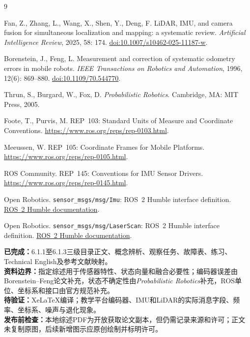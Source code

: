 \documentclass[UTF8,zihao=-4]{ctexart}
\begin{document}
\begin{thebibliography}{9}

Fan, Z., Zhang, L., Wang, X., Shen, Y., Deng, F.
LiDAR, IMU, and camera fusion for simultaneous localization and mapping: a systematic review.
\emph{Artificial Intelligence Review}, 2025, 58: 174.
\href{https://doi.org/10.1007/s10462-025-11187-w}{doi:10.1007/s10462-025-11187-w}.

Borenstein, J., Feng, L.
Measurement and correction of systematic odometry errors in mobile robots.
\emph{IEEE Transactions on Robotics and Automation}, 1996, 12(6): 869--880.
\href{https://doi.org/10.1109/70.544770}{doi:10.1109/70.544770}.

Thrun, S., Burgard, W., Fox, D.
\emph{Probabilistic Robotics}.
Cambridge, MA: MIT Press, 2005.

Foote, T., Purvis, M.
REP~103: Standard Units of Measure and Coordinate Conventions.
\href{https://www.ros.org/reps/rep-0103.html}{https://www.ros.org/reps/rep-0103.html}.

Meeussen, W.
REP~105: Coordinate Frames for Mobile Platforms.
\href{https://www.ros.org/reps/rep-0105.html}{https://www.ros.org/reps/rep-0105.html}.

ROS Community.
REP~145: Conventions for IMU Sensor Drivers.
\href{https://www.ros.org/reps/rep-0145.html}{https://www.ros.org/reps/rep-0145.html}.

Open Robotics.
\texttt{sensor\_msgs/msg/Imu}: ROS~2 Humble interface definition.
\href{https://docs.ros.org/en/humble/p/sensor_msgs/msg/Imu.html}{ROS~2 Humble documentation}.

Open Robotics.
\texttt{sensor\_msgs/msg/LaserScan}: ROS~2 Humble interface definition.
\href{https://docs.ros.org/en/humble/p/sensor_msgs/msg/LaserScan.html}{ROS~2 Humble documentation}.

\end{thebibliography}

\noindent
\textbf{已完成：}6.1.1至6.1.3三级目录正文、概念辨析、观察任务、故障表、练习、Technical English及参考文献映射。\\
\textbf{资料边界：}指定综述用于传感器特性、状态向量和融合必要性；编码器误差由Borenstein--Feng论文补充，状态不确定性由\emph{Probabilistic Robotics}补充，ROS单位、坐标系和接口由官方规范补充。\\
\textbf{待验证：}XeLaTeX编译；教学平台编码器、IMU和LiDAR的实际消息字段、频率、坐标系、噪声与退化现象。\\
\textbf{发布前检查：}本地综述PDF为开放获取论文副本，但仍需记录来源和许可；正文未复制原图，后续新增图示应原创绘制并标明许可。
\end{document}
